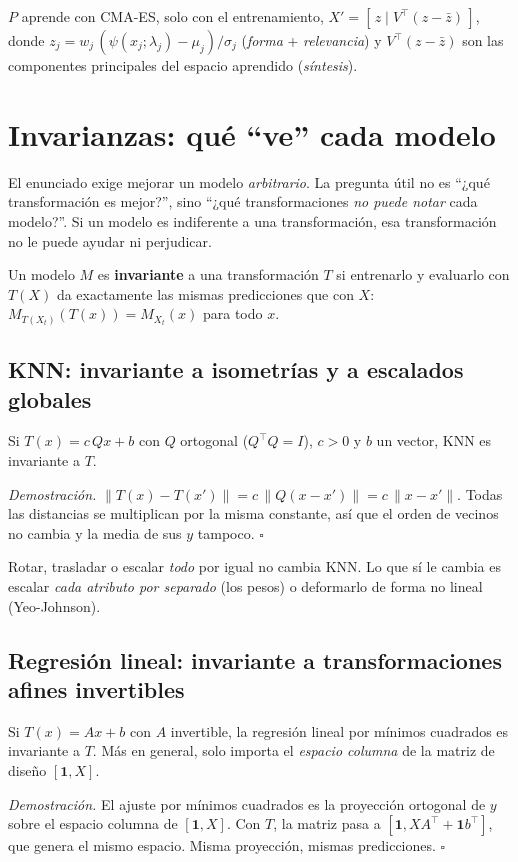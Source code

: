 \documentclass[apuntes]{uc3mmaster}
\begin{document}
\begin{resultado}
$P$ aprende con CMA-ES, solo con el entrenamiento, $X'=[\,z\mid V^\top(z-\bar z)\,]$, donde
$z_j=w_j\,(\psi(x_j;\lambda_j)-\mu_j)/\sigma_j$ (\emph{forma} + \emph{relevancia}) y $V^\top(z-\bar z)$ son las
componentes principales del espacio aprendido (\emph{síntesis}).
\end{resultado}

\section{Invarianzas: qué ``ve'' cada modelo}\label{sec:invarianzas}
El enunciado exige mejorar un modelo \emph{arbitrario}. La pregunta útil no es ``¿qué transformación es mejor?'',
sino ``¿qué transformaciones \emph{no puede notar} cada modelo?''. Si un modelo es indiferente a una transformación,
esa transformación no le puede ayudar ni perjudicar.

\begin{definicion}[Invarianza]
Un modelo $M$ es \textbf{invariante} a una transformación $T$ si entrenarlo y evaluarlo con $T(X)$ da exactamente
las mismas predicciones que con $X$: $M_{T(X_t)}(T(x))=M_{X_t}(x)$ para todo $x$.
\end{definicion}

\subsection{KNN: invariante a isometrías y a escalados globales}
\begin{proposicion}
Si $T(x)=c\,Qx+b$ con $Q$ ortogonal ($Q^\top Q=I$), $c>0$ y $b$ un vector, KNN es invariante a $T$.
\end{proposicion}
\textit{Demostración.} $\lVert T(x)-T(x')\rVert=c\,\lVert Q(x-x')\rVert=c\,\lVert x-x'\rVert$. Todas las distancias se
multiplican por la misma constante, así que el orden de vecinos no cambia y la media de sus $y$ tampoco. $\square$

Rotar, trasladar o escalar \emph{todo} por igual no cambia KNN. Lo que sí le cambia es escalar \emph{cada atributo
por separado} (los pesos) o deformarlo de forma no lineal (Yeo-Johnson).

\subsection{Regresión lineal: invariante a transformaciones afines invertibles}
\begin{proposicion}
Si $T(x)=Ax+b$ con $A$ invertible, la regresión lineal por mínimos cuadrados es invariante a $T$. Más en general,
solo importa el \emph{espacio columna} de la matriz de diseño $[\mathbf 1, X]$.
\end{proposicion}
\textit{Demostración.} El ajuste por mínimos cuadrados es la proyección ortogonal de $y$ sobre el espacio columna de
$[\mathbf 1,X]$. Con $T$, la matriz pasa a $[\mathbf 1, XA^\top+\mathbf 1b^\top]$, que genera el mismo espacio. Misma
proyección, mismas predicciones. $\square$
\end{document}
